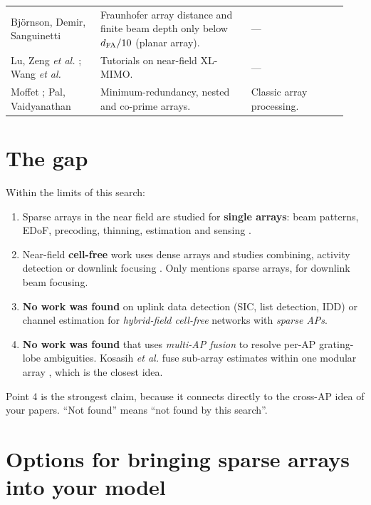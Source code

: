 \documentclass[11pt]{article}
\begin{document}
\begin{longtable}{@{}p{0.25\linewidth}p{0.42\linewidth}p{0.27\linewidth}@{}}
Bj\"ornson, Demir, Sanguinetti \cite{bjornson2021primer} & Fraunhofer array distance and finite beam depth only below $d_{\rm FA}/10$ (planar array). & ---\\
Lu, Zeng \emph{et al.} \cite{lu2024tutorial}; Wang \emph{et al.} \cite{wang2024xltutorial} & Tutorials on near-field XL-MIMO. & ---\\
Moffet \cite{moffet1968mra}; Pal, Vaidyanathan \cite{pal2010nested,vaidyanathan2011coprime} & Minimum-redundancy, nested and co-prime arrays. & Classic array processing.\\
\bottomrule
\end{longtable}

\section{The gap}
\label{sec:gap}

Within the limits of this search:
\begin{enumerate}
  \item Sparse arrays in the near field are studied for \textbf{single arrays}: beam patterns, EDoF, precoding, thinning, estimation and sensing \cite{chen2025exploring,chen2024nearfield,zhou2025sparse,wang2024sparsemimo,hussain2026thinning,li2024sparseisac,li2023modular,kosasih2025mla}.
  \item Near-field \textbf{cell-free} work uses dense arrays and studies combining, activity detection or downlink focusing \cite{wang2026combining,lei2026activity,lei2023uplink,mylonopoulos2025los}. Only \cite{xie2025beamfocusing} mentions sparse arrays, for downlink beam focusing.
  \item \textbf{No work was found} on uplink data detection (SIC, list detection, IDD) or channel estimation for \emph{hybrid-field cell-free} networks with \emph{sparse APs}.
  \item \textbf{No work was found} that uses \emph{multi-AP fusion} to resolve per-AP grating-lobe ambiguities. Kosasih \emph{et al.} fuse sub-array estimates within one modular array \cite{kosasih2025mla}, which is the closest idea.
\end{enumerate}
Point 4 is the strongest claim, because it connects directly to the cross-AP idea of your papers. ``Not found'' means ``not found by this search''.

\section{Options for bringing sparse arrays into your model}
\label{sec:options}
\end{document}
